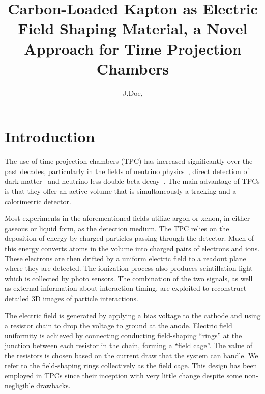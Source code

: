 \documentclass[a4paper,12pt]{article}
\title{Carbon-Loaded Kapton as Electric Field Shaping Material, a Novel Approach for Time Projection Chambers}
\author[a,1]{J.Doe,\note{Corresponding author}}
\affiliation[a]{SLAC National Accelerator Laboratory,\\ Sand Hill Rd. Menlo Park, Ca, 94025, USA}
\affiliation[b]{Michigan State University,\\ 426 Auditorium Rd. East Lansing, Mi, 48824, USA}
\begin{document}
\listoftodos
\maketitle
\section{Introduction}
\label{sec:intro}

The use of time projection chambers (TPC) has increased significantly over the past decades, particularly in the fields of neutrino physics~\cite{Acciarri:2016ooe,Adams:2019bzt,Amerio:2004ze}, direct detection of dark matter~\cite{Aprile:2012zx,Akerib:2019fml,Aalseth:2017fik} and neutrino-less double beta-decay~\cite{Pocar:2020zqz}. 
The main advantage of TPCs is that they offer an active volume that is simultaneously a tracking and a calorimetric detector.

Most experiments in the aforementioned fields utilize argon or xenon, in either gaseous or liquid form, as the detection medium. 
The TPC relies on the deposition of energy by charged particles passing through the detector. 
Much of this energy converts atoms in the volume into charged pairs of electrons and ions. 
These electrons are then drifted by a uniform electric field to a readout plane where they are detected. 
The ionization process also produces scintillation light which is collected by photo sensors. 
The combination of the two signals, as well as external information about interaction timing, are exploited to reconstruct detailed 3D images of particle interactions.


The electric field is generated by applying a bias voltage to the cathode and using a resistor chain to drop the voltage to ground at the anode.  
Electric field uniformity is achieved by connecting conducting field-shaping ``rings'' at the junction between each resistor in the chain, forming a ``field cage''. 
The value of the resistors is chosen based on the current draw that the system can handle.
We refer to the field-shaping rings collectively as the field cage. 
This design has been employed in TPCs since their inception with very little change despite some non-negligible drawbacks. 
\end{document}
